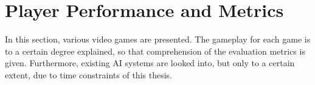 \chapter{Player Performance and Metrics} \label{sec:ppm}
In this section, various video games are presented. The gameplay for each game is to a certain degree explained, so that comprehension of  the evaluation metrics is given. Furthermore, existing AI systems are looked into, but only to a certain extent, due to time constraints of this thesis.







